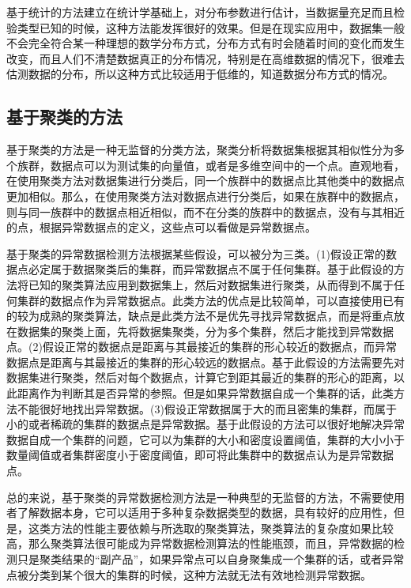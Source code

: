 基于统计的方法建立在统计学基础上，对分布参数进行估计，当数据量充足而且检验类型已知的时候，这种方法能发挥很好的效果。但是在现实应用中，数据集一般不会完全符合某一种理想的数学分布方式，分布方式有时会随着时间的变化而发生改变，而且人们不清楚数据真正的分布情况，特别是在高维数据的情况下，很难去估测数据的分布，所以这种方式比较适用于低维的，知道数据分布方式的情况。

\subsection{基于聚类的方法}
基于聚类的方法是一种无监督的分类方法，聚类分析将数据集根据其相似性分为多个族群，数据点可以为测试集的向量值，或者是多维空间中的一个点。直观地看，在使用聚类方法对数据集进行分类后，同一个族群中的数据点比其他类中的数据点更加相似。那么，在使用聚类方法对数据点进行分类后，如果在族群中的数据点，则与同一族群中的数据点相近相似，而不在分类的族群中的数据点，没有与其相近的点，根据异常数据点的定义，这些点可以看做是异常数据点。
 
基于聚类的异常数据检测方法根据某些假设，可以被分为三类。(1)假设正常的数据点必定属于数据聚类后的集群，而异常数据点不属于任何集群。基于此假设的方法将已知的聚类算法应用到数据集上，然后对数据集进行聚类，从而得到不属于任何集群的数据点作为异常数据点。此类方法的优点是比较简单，可以直接使用已有的较为成熟的聚类算法，缺点是此类方法不是优先寻找异常数据点，而是将重点放在数据集的聚类上面，先将数据集聚类，分为多个集群，然后才能找到异常数据点。(2)假设正常的数据点是距离与其最接近的集群的形心较近的数据点，而异常数据点是距离与其最接近的集群的形心较远的数据点。基于此假设的方法需要先对数据集进行聚类，然后对每个数据点，计算它到距其最近的集群的形心的距离，以此距离作为判断其是否异常的参照。但是如果异常数据自成一个集群的话，此类方法不能很好地找出异常数据。(3)假设正常数据属于大的而且密集的集群，而属于小的或者稀疏的集群的数据点是异常数据。基于此假设的方法可以很好地解决异常数据自成一个集群的问题，它可以为集群的大小和密度设置阈值，集群的大小小于数量阈值或者集群密度小于密度阈值，即可将此集群中的数据点认为是异常数据点。

总的来说，基于聚类的异常数据检测方法是一种典型的无监督的方法，不需要使用者了解数据本身，它可以适用于多种复杂数据类型的数据，具有较好的应用性，但是，这类方法的性能主要依赖与所选取的聚类算法，聚类算法的复杂度如果比较高，那么聚类算法很可能成为异常数据检测算法的性能瓶颈，而且，异常数据的检测只是聚类结果的“副产品”，如果异常点可以自身聚集成一个集群的话，或者异常点被分类到某个很大的集群的时候，这种方法就无法有效地检测异常数据。

